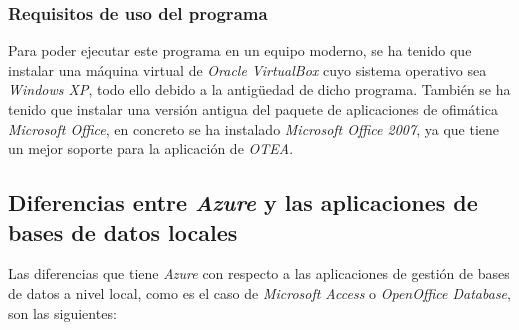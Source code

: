     \subsubsection{Requisitos de uso del programa}
    Para poder ejecutar este programa en un equipo moderno, se ha tenido que instalar una máquina virtual de \textit{Oracle VirtualBox} cuyo sistema operativo sea \textit{Windows XP}, todo ello debido a la antigüedad de dicho programa.
    También se ha tenido que instalar una versión antigua del paquete de aplicaciones de ofimática \textit{Microsoft Office}, en concreto se ha instalado \textit{Microsoft Office 2007}, ya que tiene un mejor soporte para la aplicación de \textit{OTEA}.

    \subsection{Diferencias entre \textit{Azure} y las aplicaciones de bases de datos locales}
    Las diferencias que tiene \textit{Azure} con respecto a las aplicaciones de gestión de bases de datos a nivel local, 
    como es el caso de \textit{Microsoft Access} o \textit{OpenOffice Database}, son las siguientes:
